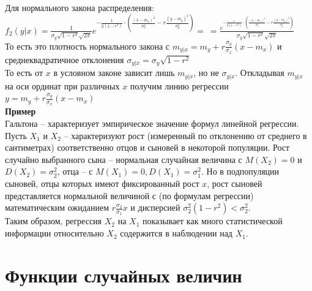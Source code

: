 \documentclass[russian, 12pt, fleqn]{article}
\begin{document}
\\
Для нормального закона распределения: $f_2(y|x) = \frac{1}{\sigma_y \sqrt{1 - r^2} \sqrt{2\pi}}  e^{{-\frac{1}{2(1-r^2)}\cdot (\frac{(x-m_x)^2}{\sigma_x^2}  -r \frac{(y-m_y)^2}{\sigma_y^2})}}  =\ = \frac{  e^{{-\frac{1}{2(1-r^2)}\cdot (\frac{(x-m_x)^2}{\sigma_x^2}  -r \frac{(y-m_y)^2}{\sigma_y^2})}} }{\sigma_y \sqrt{1 - r^2} \sqrt{2\pi}}$\\
То есть это плотность нормального закона с $m_{y|x} = m_y + r \frac{\sigma_y}{\sigma_x} (x - m_x)$  и среднеквадратичное отклонения $\sigma_{y|x} = \sigma_{y} \sqrt{1-r^2}$ \\
То есть от $x$ в условном законе зависит лишь $m_{y|x}$, но не $\sigma_{y|x}$. Откладывая  $m_{y|x}$ на оси ординат при различных $x$ получим линию регрессии $y=m_y + r\frac{\sigma_y}{\sigma_x}(x-m_x)$\\
\textbf{Пример}\\
Гальтона -- характеризует эмпирическое значение формул линейной регрессии. Пусть $X_1$ и $X_2$ -- характеризуют рост (измеренный по отклонению от среднего в сантиметрах) соответственно отцов и сыновей в некоторой популяции. Рост случайно выбранного сына -- нормальная случайная величина с $M(X_2) = 0$ и $D(X_2) = \sigma_2^2$,
отца -- с $M(X_1) = 0, D(X_1) = \sigma_1^2$. Но в подпопуляции сыновей, отцы которых имеют фиксированный рост $x$, рост сыновей представляется нормальной величиной с (по формулам регрессии) математическим ожиданием  $r\frac{\sigma_2}{\sigma_1} x$ и дисперсией $\sigma_2^2(1-r^2) < \sigma_2^2$.\\
Таким образом, регрессия $X_2$ на $X_1$ показывает как много статистической информации относительно $X_2$ содержится в наблюдении над $X_1$.\\
\section{Функции случайных величин}
\end{document}
